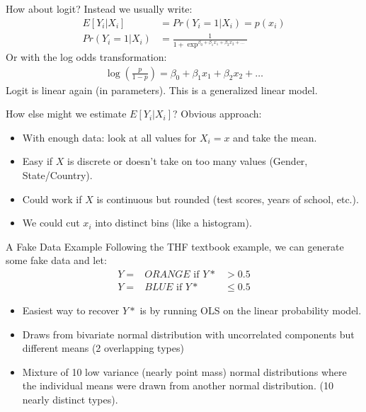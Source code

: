 \documentclass[11pt,handout,xcolor=pdftex,dvipsnames,table,mathserif,aspectratio=169]{beamer}
\begin{document}
\begin{frame}{How about logit?}
Instead we usually write:
\begin{align*}
E[Y_i | X_i] &= Pr(Y_i =1 | X_i) = p(x_i)\\
 Pr(Y_i =1 | X_i)  &= \frac{1}{1+\exp^{\beta_0 + \beta_1 x_1 + \beta_2 x_2 + \ldots}}
\end{align*}
Or with the log odds transformation:
\begin{align*}
\log \left(\frac{p}{1-p} \right) =\beta_0 + \beta_1 x_1 + \beta_2 x_2 + \ldots
\end{align*}
Logit is \alert{linear} again (in parameters). This is a \alert{generalized linear model}.
\end{frame}

\begin{frame}{How else might we estimate $E[Y_i | X_i]$?}
Obvious approach:
\begin{itemize}
\item With enough data: look at all values for $X_i = x$ and take the mean.
\item Easy if $X$ is discrete or doesn't take on too many values (Gender, State/Country).
\item Could work if $X$ is continuous but rounded (test scores, years of school, etc.).
\item We could cut $x_i$ into distinct bins (like a histogram).
\end{itemize}
\end{frame}


\begin{frame}{A Fake Data Example}
Following the THF textbook example, we can generate some fake data and let: 
\begin{eqnarray*}
Y=&ORANGE \mbox{ if } Y* &> 0.5 \\
Y=&BLUE  \mbox{ if }   Y* &\leq 0.5
\end{eqnarray*}
\begin{itemize}
\item Easiest way to recover $Y*$ is by running OLS on the linear probability model.
\item Draws from bivariate normal distribution with uncorrelated components but different means (2 overlapping types)
\item Mixture of 10 low variance (nearly point mass) normal distributions where the individual means were drawn from another normal distribution. (10 nearly distinct types).
\end{itemize}
\end{frame}
\end{document}
